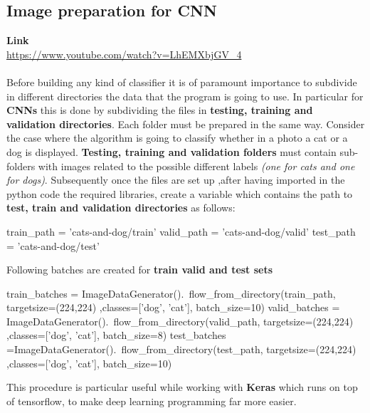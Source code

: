 \documentclass[11pt]{article}
\begin{document}
\subsection{Image preparation for CNN}
\textbf{Link}\\
\url{https://www.youtube.com/watch?v=LhEMXbjGV_4}\\\\
Before building any kind of classifier it is of paramount importance to subdivide in different directories the data that the program is going to use. In particular for \textbf{CNNs} this is done by subdividing the files in \textbf{testing, training and validation directories}. 
Each folder must be prepared in the same way. Consider the case where the algorithm is going to classify whether in a photo  a cat or a dog is displayed. \textbf{Testing, training and validation folders } must contain sub-folders with images related to  the possible different labels \textit{(one for cats and one for dogs)}. Subsequently once the files are set up ,after having imported in the python code the required libraries, create a variable which contains the path to \textbf{test, train and validation directories } as follows:
\begin{python}
train_path = 'cats-and-dog/train'
valid_path = 'cats-and-dog/valid'
test_path = 'cats-and-dog/test'
\end{python}{}
Following batches are created for \textbf{train valid and test sets}
\begin{python}
train_batches = ImageDataGenerator().\
    flow_from_directory(train_path, targetsize=(224,224)
                        ,classes=['dog', 'cat'], batch_size=10)
valid_batches = ImageDataGenerator().\
    flow_from_directory(valid_path, targetsize=(224,224)
                        ,classes=['dog', 'cat'], batch_size=8)
test_batches =ImageDataGenerator().\
    flow_from_directory(test_path, targetsize=(224,224)
                        ,classes=['dog', 'cat'], batch_size=10)
\end{python}{}
This procedure is particular useful while working with \textbf{Keras} which runs on top of tensorflow, to make deep learning programming far more easier.
\clearpage
\end{document}
